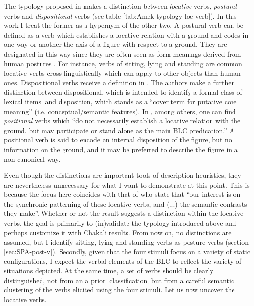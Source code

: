 The typology proposed in  \cite{Amek07b}  makes a distinction between  {\it
locative} verbs, {\it postural} verbs and   {\it dispositional} verbs (see table
\ref{tab:Amek-typology-loc-verb}).  In this work I treat the former as a
hypernym of the other two. A postural verb can be defined as
a verb which establishes  a locative relation with a ground and  codes in one
way or another the axis of a figure with respect to a ground.   They are
designated in this way since they are often seen as form-meanings derived from
human postures \citep{Newm02}. For instance, verbs of sitting, lying and
standing are common locative verbs cross-linguistically which can apply to
other objects than human ones. Dispositional verbs receive a definition in
\citet[1107-1108]{Bohn07}. The authors make a further distinction between
dispositional,
which is intended to identify a formal class of lexical items, and disposition,
which stands as a ``cover term for putative core meaning''  (i.e.
conceptual/semantic features). In \citet[909]{Hell07}, among others, one
can
find {\it positional} verbs which ``do not necessarily establish a locative
relation with the ground, but may participate or stand alone as the main BLC
predication.'' A positional verb is said to encode an internal disposition of
the
figure, but no information on the ground, and it may be preferred to  describe
the
figure in a non-canonical way. 

Even though the distinctions are important tools
of description heuristics,   they are nevertheless unnecessary
for what I want to demonstrate at this point. This is because the focus here
coincides with that of  \citet[848]{Amek07b} who state that ``our interest is
on the
synchronic patterning of these locative verbs, and (...) the semantic contrasts
they make''.  Whether or not the result suggests a distinction within the
locative verbs, the goal is primarily to (in)validate the typology introduced
above and perhaps customize it with Chakali results. From now on, no 
distinctions are assumed, but I identify sitting, lying
and standing verbs as posture verbs (section \ref{sec:SPA-post-v}). Secondly,
given that the four stimuli focus on a variety of static
configurations, I expect  the verbal elements of the BLC to reflect the variety
of situations depicted. At the same time, a set of verbs should be clearly
distinguished, not from an a priori classification, but from a careful
 semantic clustering of the verbs elicited using the four stimuli. Let us
now
uncover the
locative verbs.



